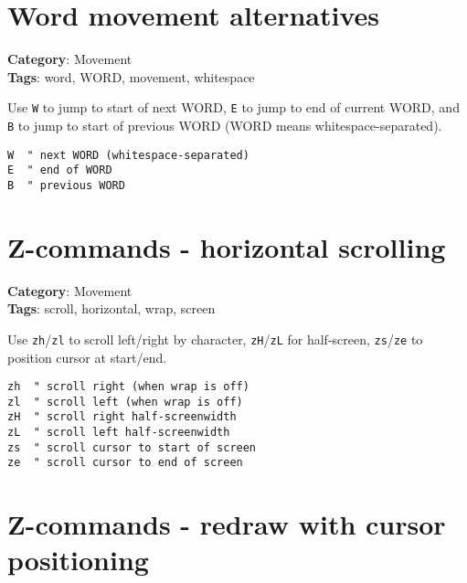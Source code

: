 {{{{{{{\section{Word movement alternatives}

\textbf{Category}: Movement\\ \textbf{Tags}: word, WORD, movement, whitespace
\vspace{0.5cm}

Use {\footnotesize \Verb§W§} to jump to start of next WORD, {\footnotesize \Verb§E§} to jump to end of current WORD, and {\footnotesize \Verb§B§} to jump to start of previous WORD (WORD means whitespace-separated).

\begin{Exa*}{}
\begin{Verbatim}[fontsize=\footnotesize, breaklines, breakanywhere]
W  " next WORD (whitespace-separated)
E  " end of WORD
B  " previous WORD
\end{Verbatim}
\end{Exa*}

\section{Z-commands - horizontal scrolling}

\textbf{Category}: Movement\\ \textbf{Tags}: scroll, horizontal, wrap, screen
\vspace{0.5cm}

Use {\footnotesize \Verb§zh§}/{\footnotesize \Verb§zl§} to scroll left/right by character, {\footnotesize \Verb§zH§}/{\footnotesize \Verb§zL§} for half-screen, {\footnotesize \Verb§zs§}/{\footnotesize \Verb§ze§} to position cursor at start/end.

\begin{Exa*}{}
\begin{Verbatim}[fontsize=\footnotesize, breaklines, breakanywhere]
zh  " scroll right (when wrap is off)
zl  " scroll left (when wrap is off)
zH  " scroll right half-screenwidth
zL  " scroll left half-screenwidth
zs  " scroll cursor to start of screen
ze  " scroll cursor to end of screen
\end{Verbatim}
\end{Exa*}

\section{Z-commands - redraw with cursor positioning}

}}}}}}}
